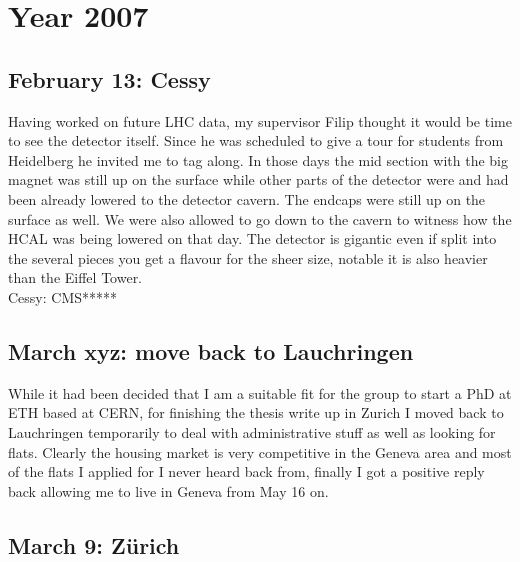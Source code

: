 \chapter{Year 2007}
\label{2007}

\section{February 13: Cessy}
\label{2007:Cessy}

Having worked on future LHC data, my supervisor Filip thought it would be time to see the detector itself. Since he was scheduled to give a tour for students from Heidelberg he invited me to tag along. In those days the mid section with the big magnet was still up on the surface while other parts of the detector were and had been already lowered to the detector cavern. The endcaps were still up on the surface as well. We were also allowed to go down to the cavern to witness how the HCAL was being lowered on that day. The detector is gigantic even if split into the several pieces you get a flavour for the sheer size, notable it is also heavier than the Eiffel Tower.\\

Cessy: CMS*****

\section{March xyz: move back to Lauchringen}
\label{moveLauchringen2006}

While it had been decided that I am a suitable fit for the group to start a PhD at ETH based at CERN, for finishing the thesis write up in Zurich I moved back to Lauchringen temporarily to deal with administrative stuff as well as looking for flats. Clearly the housing market is very competitive in the Geneva area and most of the flats I applied for I never heard back from, finally I got a positive reply back allowing me to live in Geneva from May 16 on. 


\section{March 9: Z\"urich}
\label{2007:Zuerich}

